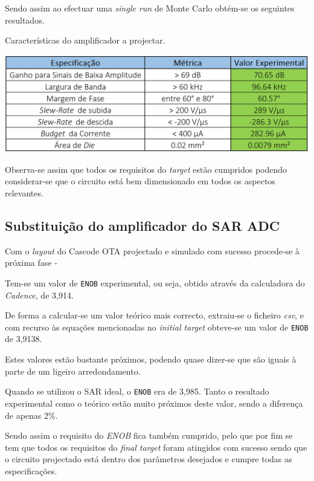 \documentclass[11pt]{article}
\numberwithin{equation}{section}
\begin{document}
Sendo assim ao efectuar uma \textit{single run} de Monte Carlo obtém-se os seguintes resultados.

\begin{table}[H]
	\centering
	\caption{Características do amplificador a projectar.}
	\vspace{-1.5mm}
	\includegraphics[keepaspectratio=true, scale=0.35]{teoricas/specsfinalLayout}
\end{table}

Observa-se assim que todos os requisitos do \textit{target} estão cumpridos podendo considerar-se que o circuito está bem dimensionado em todos os aspectos relevantes.
 

\subsection{Substituição do amplificador do SAR ADC}

Com o \textit{layout} do Cascode OTA projectado e simulado com sucesso procede-se à próxima fase - 

Tem-se um valor de \texttt{ENOB} experimental, ou seja, obtido através da calculadora do \textit{Cadence}, de 3,914.

De forma a calcular-se um valor teórico mais correcto, extraiu-se o ficheiro \textit{csv}, e com recurso às equações mencionadas no \textit{initial target} obteve-se um valor de \texttt{ENOB} de 3,9138.

Estes valores estão bastante próximos, podendo quase dizer-se que são iguais à parte de um ligeiro arredondamento.

Quando se utilizou o SAR ideal, o \texttt{ENOB} era de 3,985. Tanto o resultado experimental como o teórico estão muito próximos deste valor, sendo a diferença de apenas 2\%. 

Sendo assim o requisito do \textit{ENOB} fica também cumprido, pelo que por fim se tem que todos os requisitos do \textit{final target} foram atingidos com sucesso sendo que o circuito projectado está dentro dos parâmetros desejados e cumpre todas as especificações.
\end{document}
